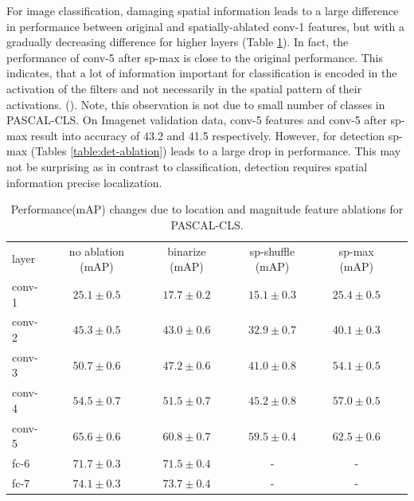 For image classification, damaging spatial information leads to a large difference in performance between original and spatially-ablated conv-1 features, but with a gradually decreasing difference for higher layers (Table \ref{table:class-ablation}). 
In fact, the performance of conv-5 after sp-max is close to the original performance. 
This indicates, that a lot of information important for classification is encoded in the activation of the filters and not necessarily in the spatial pattern of their activations. ().
Note, this observation is not due to small number of classes in PASCAL-CLS. On Imagenet validation data, conv-5 features and conv-5 after sp-max result into accuracy of 43.2 and 41.5 respectively. 
However, for detection sp-max (Tables \ref{table:det-ablation}) leads to a large drop in performance. 
This may not be surprising as in contrast to classification, detection requires spatial information precise localization.

\setlength{\tabcolsep}{4pt}
\begin{table}[t!]
\begin{center}
\caption{Performance(mAP) changes due to location and magnitude feature ablations for PASCAL-CLS.}
\label{table:class-ablation}
\begin{tabular}{lccccc}
\hline\noalign{\smallskip}
layer & no ablation (mAP) & binarize (mAP) & sp-shuffle (mAP) & sp-max (mAP) \\
\noalign{\smallskip}
\hline
\noalign{\smallskip}
conv-1 & $25.1 \pm 0.5$ & $17.7 \pm 0.2$ & $15.1 \pm 0.3$ & $25.4 \pm 0.5$  \\ 
conv-2 & $45.3 \pm 0.5$ & $43.0 \pm 0.6$ & $32.9 \pm 0.7$ & $40.1 \pm 0.3$  \\ 
conv-3 & $50.7 \pm 0.6$ & $47.2 \pm 0.6$ & $41.0 \pm 0.8$ & $54.1 \pm 0.5$  \\
conv-4 & $54.5 \pm 0.7$ & $51.5 \pm 0.7$ & $45.2 \pm 0.8$ & $57.0 \pm 0.5$  \\
conv-5 & $65.6 \pm 0.6$ & $60.8 \pm 0.7$ & $59.5 \pm 0.4$ & $62.5 \pm 0.6$  \\
fc-6   & $71.7 \pm 0.3$ & $71.5 \pm 0.4$ &  -             &  -   \\
fc-7   & $74.1 \pm 0.3$ & $73.7 \pm 0.4$ &  -             &  -   \\
\hline
\end{tabular}
\end{center}
\end{table}
\setlength{\tabcolsep}{1.4pt}


